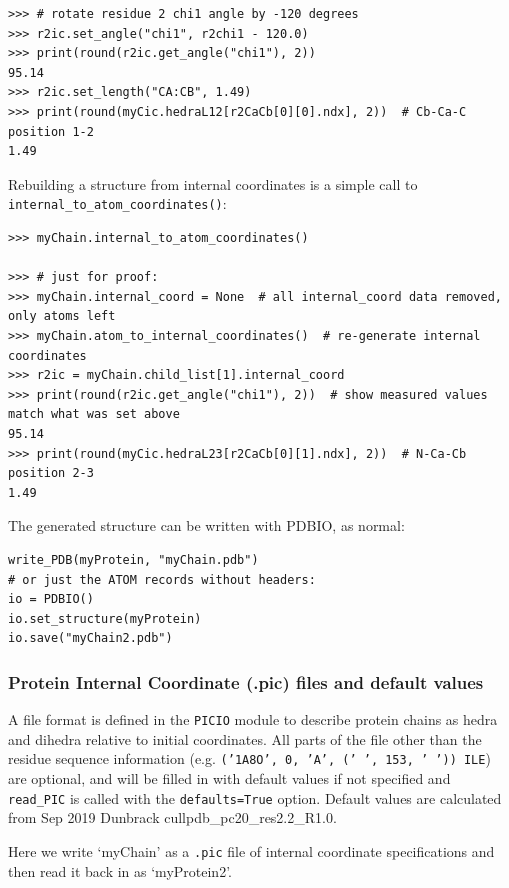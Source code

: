 \begin{verbatim}
>>> # rotate residue 2 chi1 angle by -120 degrees
>>> r2ic.set_angle("chi1", r2chi1 - 120.0)
>>> print(round(r2ic.get_angle("chi1"), 2))
95.14
>>> r2ic.set_length("CA:CB", 1.49)
>>> print(round(myCic.hedraL12[r2CaCb[0][0].ndx], 2))  # Cb-Ca-C position 1-2
1.49
\end{verbatim}

Rebuilding a structure from internal coordinates is a simple call to
\verb|internal_to_atom_coordinates()|:

\begin{verbatim}
>>> myChain.internal_to_atom_coordinates()

>>> # just for proof:
>>> myChain.internal_coord = None  # all internal_coord data removed, only atoms left
>>> myChain.atom_to_internal_coordinates()  # re-generate internal coordinates
>>> r2ic = myChain.child_list[1].internal_coord
>>> print(round(r2ic.get_angle("chi1"), 2))  # show measured values match what was set above
95.14
>>> print(round(myCic.hedraL23[r2CaCb[0][1].ndx], 2))  # N-Ca-Cb position 2-3
1.49
\end{verbatim}

The generated structure can be written with PDBIO, as normal:

\begin{verbatim}
write_PDB(myProtein, "myChain.pdb")
# or just the ATOM records without headers:
io = PDBIO()
io.set_structure(myProtein)
io.save("myChain2.pdb")
\end{verbatim}

\subsubsection{Protein Internal Coordinate (.pic) files and default values}

A file format is defined in the \texttt{PICIO} module to describe protein chains as hedra and
dihedra relative to initial coordinates.  All parts of the file other than the residue sequence
information (e.g. \texttt{('1A8O', 0, 'A', (' ', 153, ' ')) ILE}) are optional, and will be
filled in with default values if not specified and \texttt{read\_PIC\(\)} is called with the
\texttt{defaults=True} option.  Default values are calculated from Sep 2019 Dunbrack
cullpdb\_pc20\_res2.2\_R1.0.

Here we write `myChain' as a \texttt{.pic} file of internal coordinate specifications and then
read it back in as `myProtein2'.  

